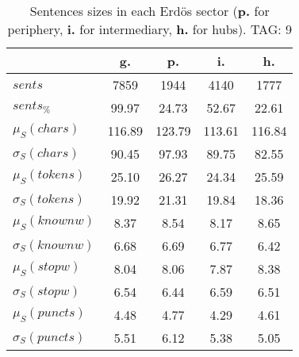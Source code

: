 \begin{table}[h!]
\begin{center}
\begin{tabular}{| l | c | c | c | c |}\hline
 & g. & p. & i. & h. \\\hline
$sents$ & 7859  & 1944  & 4140  & 1777 \\\hline
$sents_{\%}$ & 99.97  & 24.73  & 52.67  & 22.61 \\\hline
$\mu_S(chars)$ & 116.89  & 123.79  & 113.61  & 116.84 \\\hline
$\sigma_S(chars)$ & 90.45  & 97.93  & 89.75  & 82.55 \\\hline
$\mu_S(tokens)$ & 25.10  & 26.27  & 24.34  & 25.59 \\\hline
$\sigma_S(tokens)$ & 19.92  & 21.31  & 19.84  & 18.36 \\\hline
$\mu_S(knownw)$ & 8.37  & 8.54  & 8.17  & 8.65 \\\hline
$\sigma_S(knownw)$ & 6.68  & 6.69  & 6.77  & 6.42 \\\hline
$\mu_S(stopw)$ & 8.04  & 8.06  & 7.87  & 8.38 \\\hline
$\sigma_S(stopw)$ & 6.54  & 6.44  & 6.59  & 6.51 \\\hline
$\mu_S(puncts)$ & 4.48  & 4.77  & 4.29  & 4.61 \\\hline
$\sigma_S(puncts)$ & 5.51  & 6.12  & 5.38  & 5.05 \\\hline
\end{tabular}
\caption{Sentences sizes in each Erd\"os sector ({{\bf p.}} for periphery, {{\bf i.}} for intermediary, {{\bf h.}} for hubs). TAG: 9}
\end{center}
\end{table}